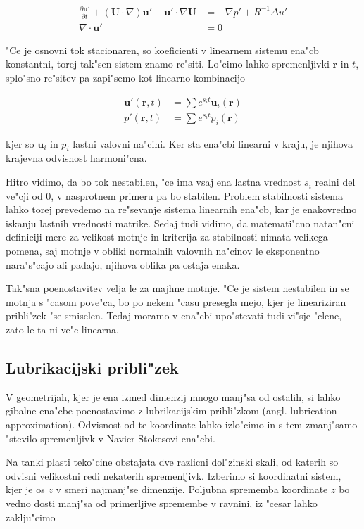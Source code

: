 \documentclass[a4paper,12pt]{article}
\renewcommand{\vec}{\mathbf}
\newcommand{\rt}{(\vec r, t)}
\begin{document}
\begin{align}
 \label{eq:ns-linearna}
\frac{\partial \vec u'}{\partial t} + (\vec U \cdot \nabla) \vec u' + \vec u' \cdot \nabla \vec U &= -\nabla p' + R^{-1}\Delta u' \\
\label{eq:nestisljivost-linearna}
\nabla \cdot \vec u' &= 0
\end{align}

"Ce je osnovni tok stacionaren, so koeficienti v linearnem sistemu ena"cb konstantni, torej tak"sen sistem znamo re"siti. Lo"cimo lahko spremenljivki $\vec r$ in $t$, splo"sno re"sitev pa zapi"semo kot linearno kombinacijo

\begin{align}
 \vec u'\rt &= \sum e^{s_i t} \vec u_i(\vec r) \\
 p'\rt &= \sum e^{s_i t} p_i(\vec r)
\end{align}

kjer so $\vec u_i$ in $p_i$ lastni valovni na"cini. Ker sta ena"cbi linearni v kraju, je njihova krajevna odvisnost harmoni"cna. 

Hitro vidimo, da bo tok nestabilen, "ce ima vsaj ena lastna vrednost $s_i$ realni del ve"cji od 0, v nasprotnem primeru pa bo stabilen. Problem stabilnosti sistema lahko torej prevedemo na re"sevanje sistema linearnih ena"cb, kar je enakovredno iskanju lastnih vrednosti matrike. Sedaj tudi vidimo, da matemati"cno natan"cni definiciji mere za velikost motnje in kriterija za stabilnosti nimata velikega pomena, saj motnje v obliki normalnih valovnih na"cinov le eksponentno nara"s"cajo ali padajo, njihova oblika pa ostaja enaka. 

Tak"sna poenostavitev velja le za majhne motnje. "Ce je sistem nestabilen in se motnja s "casom pove"ca, bo po nekem "casu presegla mejo, kjer je lineariziran pribli"zek "se smiselen. Tedaj moramo v ena"cbi upo"stevati tudi vi"sje "clene, zato le-ta ni ve"c linearna. 

\subsection{Lubrikacijski pribli"zek}

V geometrijah, kjer je ena izmed dimenzij mnogo manj"sa od ostalih, si lahko gibalne ena"cbe poenostavimo z lubrikacijskim pribli"zkom (angl. lubrication approximation). Odvisnost od te koordinate lahko izlo"cimo in s tem zmanj"samo "stevilo spremenljivk v Navier-Stokesovi ena"cbi. 

Na tanki plasti teko"cine obstajata dve razlicni dol"zinski skali, od katerih so odvisni velikostni redi nekaterih spremenljivk. Izberimo si koordinatni sistem, kjer je os $z$ v smeri najmanj"se dimenzije. Poljubna sprememba koordinate $z$ bo vedno dosti manj"sa od primerljive spremembe v ravnini, iz "cesar lahko zaklju"cimo 
\end{document}
